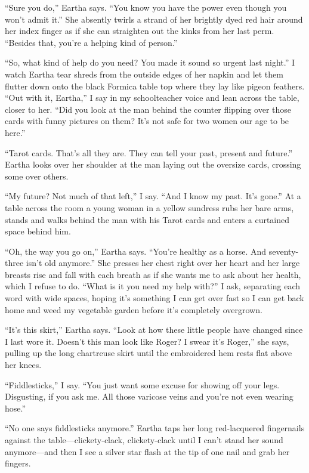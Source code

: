 \documentclass[twoside,10pt]{book}
\begin{document}
``Sure you do,'' Eartha says. ``You know you have the power even though
you won't admit it.'' She absently twirls a strand of her brightly dyed
red hair around her index finger as if she can straighten out the kinks
from her last perm. ``Besides that, you're a helping kind of person.''

``So, what kind of help do you need? You made it sound so urgent last
night.'' I watch Eartha tear shreds from the outside edges of her napkin
and let them flutter down onto the black Formica table top where they
lay like pigeon feathers. ``Out with it, Eartha,'' I say in my
schoolteacher voice and lean across the table, closer to her. ``Did you
look at the man behind the counter flipping over those cards with funny
pictures on them? It's not safe for two women our age to be here.''

``Tarot cards. That's all they are. They can tell your past, present and
future.'' Eartha looks over her shoulder at the man laying out the
oversize cards, crossing some over others.

``My future? Not much of that left,'' I say. ``And I know my past. It's
gone.'' At a table across the room a young woman in a yellow sundress
rubs her bare arms, stands and walks behind the man with his Tarot cards
and enters a curtained space behind him.

``Oh, the way you go on,'' Eartha says. ``You're healthy as a horse. And
seventy-three isn't old anymore.'' She presses her chest right over her
heart and her large breasts rise and fall with each breath as if she
wants me to ask about her health, which I refuse to do. ``What is it you
need my help with?'' I ask, separating each word with wide spaces,
hoping it's something I can get over fast so I can get back home and
weed my vegetable garden before it's completely overgrown.

``It's this skirt,'' Eartha says. ``Look at how these little people have
changed since I last wore it. Doesn't this man look like Roger? I swear
it's Roger,'' she says, pulling up the long chartreuse skirt until the
embroidered hem rests flat above her knees.

``Fiddlesticks,'' I say. ``You just want some excuse for showing off
your legs. Disgusting, if you ask me. All those varicose veins and
you're not even wearing hose.''

``No one says fiddlesticks anymore.'' Eartha taps her long red-lacquered
fingernails against the table---clickety-clack, clickety-clack until I
can't stand her sound anymore---and then I see a silver star flash at
the tip of one nail and grab her fingers.
\end{document}
